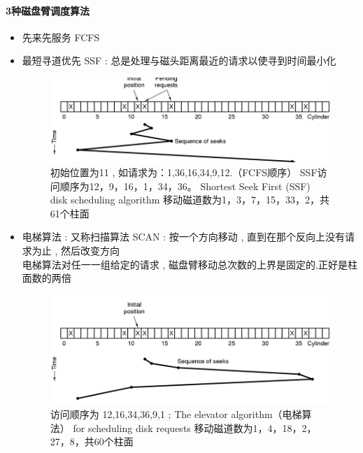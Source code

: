 \documentclass[UTF8,a4paper]{ctexart}
\begin{document}
\paragraph{3种磁盘臂调度算法}
\begin{itemize}
	\item 先来先服务 FCFS 
	\item 最短寻道优先 SSF : 总是处理与磁头距离最近的请求以使寻到时间最小化
	\begin{figure}[H]
		\centering
		\includegraphics[scale = 0.5]{assets/ModernOperatingSystems/2018-01-10-18-04-58.png}
		\caption{初始位置为11 , 如请求为：1,36,16,34,9,12.（FCFS顺序）
SSF访问顺序为12，9，16，1，34，36。
Shortest Seek First (SSF) disk scheduling algorithm
移动磁道数为1，3，7，15，33，2，共61个柱面}
	\end{figure}
	
	\item 电梯算法 : 又称扫描算法 SCAN : 按一个方向移动 , 直到在那个反向上没有请求为止 , 然后改变方向\\
	电梯算法对任一一组给定的请求 , 磁盘臂移动总次数的上界是固定的,正好是柱面数的两倍

	\begin{figure}[H]
		\centering
		\includegraphics[scale = 0.5]{assets/ModernOperatingSystems/2018-01-10-18-05-23.png}
		\caption{访问顺序为 12,16,34,36,9,1 ; 
The elevator algorithm（电梯算法） for scheduling disk requests
移动磁道数为1，4，18，2，27，8，共60个柱面}
	\end{figure}
	
\end{itemize}
\end{document}
